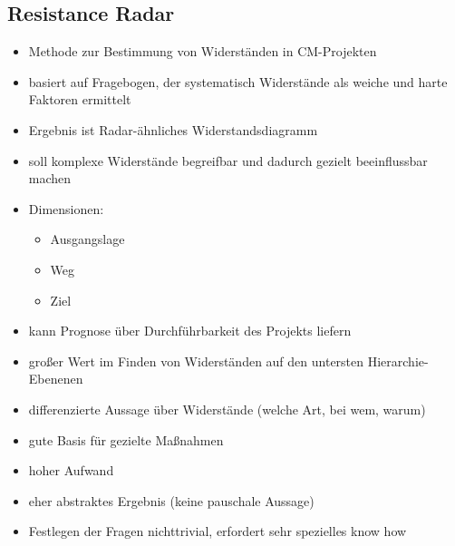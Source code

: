\documentclass[a4paper, 12pt]{article}
\begin{document}
\subsection{Resistance Radar}
\begin{itemize}
  \item Methode zur Bestimmung von Widerständen in CM-Projekten
  \item basiert auf Fragebogen, der systematisch Widerstände als weiche und harte Faktoren ermittelt
  \item Ergebnis ist Radar-ähnliches Widerstandsdiagramm
  \item soll komplexe Widerstände begreifbar und dadurch gezielt beeinflussbar machen
  \item Dimensionen:
    \begin{itemize}
      \item Ausgangslage
      \item Weg
      \item Ziel
    \end{itemize}
  \item kann Prognose über Durchführbarkeit des Projekts liefern
  \item großer Wert im Finden von Widerständen auf den untersten Hierarchie-Ebenenen
\end{itemize}
\begin{itemize}
  \renewcommand{\labelitemi}{+}%
  \item differenzierte Aussage über Widerstände (welche Art, bei wem, warum)
  \item gute Basis für gezielte Maßnahmen
\end{itemize}
\begin{itemize}
  \renewcommand{\labelitemi}{\(-\)}%
  \item hoher Aufwand
  \item eher abstraktes Ergebnis (keine pauschale Aussage)
  \item Festlegen der Fragen nichttrivial, erfordert sehr spezielles know how
\end{itemize}
\end{document}
